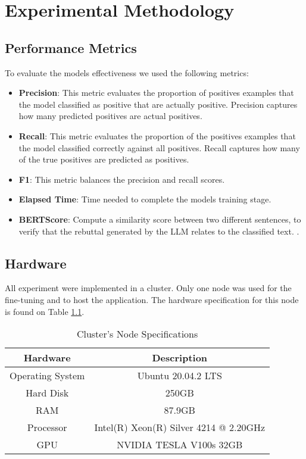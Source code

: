 
\chapter{Experimental Methodology}  

\section{Performance Metrics}
To evaluate the models effectiveness we used the following metrics:

\begin{itemize}
	\item{\textbf{Precision}}: This metric evaluates the proportion of positives examples that the model classified as positive that are actually positive. Precision captures how many
	predicted positives are actual positives.
	\item{\textbf{Recall}}: This metric evaluates the proportion of the positives examples that the model classified correctly against all positives. Recall captures how many of the true positives 
	are predicted as positives.
	\item{\textbf{F1}}: This metric balances the precision and recall scores.
	\item{\textbf{Elapsed Time}}: Time needed to complete the models training stage.
	\item{\textbf{BERTScore}}: Compute a similarity score between two different sentences, to verify that the rebuttal generated by the LLM relates to the classified text. \cite{zhang2020bertscoreevaluatingtextgeneration}.
	
\end{itemize}


\section{Hardware}
All experiment were implemented in a cluster. Only one node was used for the fine-tuning and to host the application. The hardware specification
for this node is found on Table \ref{table:hardware}.

\begin{table}[ht!]
\centering
\caption{Cluster's Node Specifications}
\begin{tabular}{||c | c||} 
 \hline
\textbf{Hardware} & \textbf{Description} \\ [0.5ex] 
 \hline
 Operating System & Ubuntu 20.04.2 LTS \\ [0.5ex] 
 \hline
 Hard Disk & 250GB  \\ [0.5ex] 
 \hline
 RAM & 87.9GB  \\ [0.5ex] 
 \hline
 Processor & Intel(R) Xeon(R) Silver 4214 @ 2.20GHz \\ [0.5ex] 
 \hline
 GPU & NVIDIA TESLA V100s 32GB \\ [0.5ex] 
 \hline
\end{tabular}
\label{table:hardware}
\end{table}


